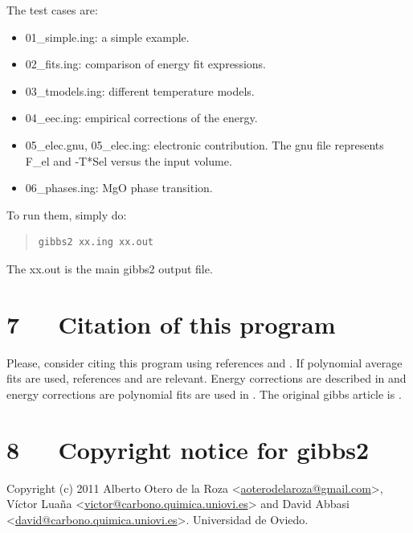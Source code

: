\documentclass[a4paper]{article}
\begin{document}
The test cases are:
%
\begin{itemize}

\item 01\_simple.ing: a simple example.

\item 02\_fits.ing: comparison of energy fit expressions.

\item 03\_tmodels.ing: different temperature models.

\item 04\_eec.ing: empirical corrections of the energy.

\item 05\_elec.gnu, 05\_elec.ing: electronic contribution. The gnu file
represents F\_el and -T*Sel versus the input volume.

\item 06\_phases.ing: MgO phase transition.

\end{itemize}

To run them, simply do:
%
\begin{quote}
\begin{verbatim}
gibbs2 xx.ing xx.out
\end{verbatim}
\end{quote}

The xx.out is the main gibbs2 output file.


\section{7~~~Citation of this program%
  \label{citation-of-this-program}%
}

Please, consider citing this program using references \cite{fit1} and
\cite{impl} . If polynomial average fits are used, references \cite{fit1} and
\cite{fit2} are relevant. Energy corrections are described in \cite{corr} and
energy corrections are polynomial fits are used in \cite{rig} . The
original gibbs article is \cite{orig}.


\section{8~~~Copyright notice for gibbs2%
  \label{copyright-notice-for-gibbs2}%
}

Copyright (c) 2011 Alberto Otero de la Roza <\href{mailto:aoterodelaroza@gmail.com}{aoterodelaroza@gmail.com}>,
Víctor Luaña <\href{mailto:victor@carbono.quimica.uniovi.es}{victor@carbono.quimica.uniovi.es}> and David
Abbasi <\href{mailto:david@carbono.quimica.uniovi.es}{david@carbono.quimica.uniovi.es}>. Universidad de Oviedo.
\end{document}
